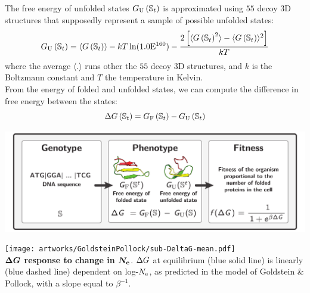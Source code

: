 \documentclass{article}
\begin{document}
The free energy of unfolded states $G_{\mathrm{U}}\left(\mathbb{S}_{t}\right)$ is approximated using $55$ decoy $3$D structures that supposedly represent a sample of possible unfolded states:
\begin{equation}
G_{\mathrm{U}}\left(\mathbb{S}_{t}\right) = \langle G\left(\mathbb{S}_{t}\right) \rangle - kT \ln (1.0\mathrm{E}^{160}) - \dfrac{2 \left[ \langle G\left(\mathbb{S}_{t}\right)^2 \rangle - \langle G\left(\mathbb{S}_{t}\right) \rangle^2\right] }{kT}
\end{equation}
where the average $\langle . \rangle$ runs other the $55$ decoy $3$D structures, and $k$ is the Boltzmann constant and $T$ the temperature in Kelvin.\\

From the energy of folded and unfolded states, we can compute the difference in free energy between the states:
\begin{equation}
\Delta G\left(\mathbb{S}_{t}\right) = G_{\mathrm{F}}\left(\mathbb{S}_{t}\right) - G_{\mathrm{U}}\left(\mathbb{S}_{t}\right)
\end{equation}

\begin{center}
	\includegraphics[width=165mm] {artworks/ModelSimuFold.pdf}
\end{center}


\begin{mdframed}
\begin{center}
	\texttt{[image: artworks/GoldsteinPollock/sub-DeltaG-mean.pdf]}\\
	\textbf{$\bm{\Delta G}$ response to change in $\bm{N_{\mathrm{e}}}$}.
	$\Delta G$ at equilibrium (blue solid line) is linearly (blue dashed line) dependent on log-$N_{\mathrm{e}}$, as predicted in the model of Goldstein \& Pollock, with a slope equal to $\beta^{-1}$.
	\label{fig:EqdndsNe}
\end{center}
\end{mdframed}
\end{document}
